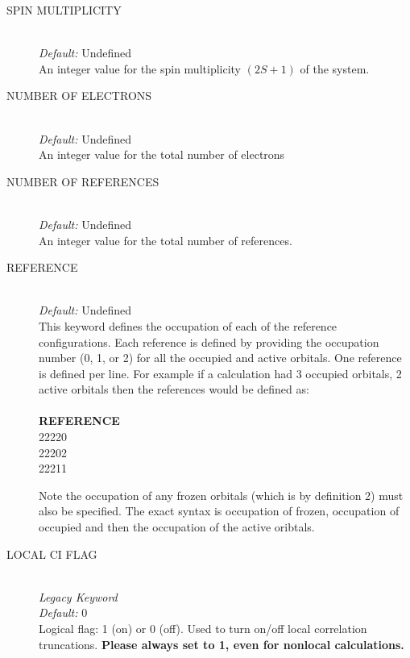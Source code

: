 \documentclass{article}
\begin{document}
\begin{description}
        \item[SPIN MULTIPLICITY ] \hfill \\
        \emph{Default:} Undefined \hfill \\
        An integer value for the spin multiplicity $(2S+1)$ of the system.
       
        \item[NUMBER OF ELECTRONS ] \hfill \\
        \emph{Default:} Undefined \hfill \\
        An integer value for the total number of electrons
        
        \item[NUMBER OF REFERENCES ] \hfill \\
        \emph{Default:} Undefined \hfill \\
        An integer value for the total number of references. 
        
        \item[REFERENCE ] \hfill \\
        \emph{Default:} Undefined \hfill \\
        This keyword defines the occupation of each of the reference configurations. Each reference is defined by providing the occupation number (0, 1, or 2) for all the occupied and active orbitals. One reference is defined per line. For example if a calculation had 3 occupied orbitals, 2 active orbitals then the references would be defined as: \hfill \\
        \hfill \\
        \textbf{REFERENCE} \hfill \\
        22220 \hfill \\
        22202 \hfill \\
        22211
                
        Note the occupation of any frozen orbitals (which is by definition 2) must also be specified. The exact syntax is occupation of frozen, occupation of occupied and then the occupation of the active oribtals. 

        \item[LOCAL CI FLAG ] \hfill \\
        \emph{Legacy Keyword} \hfill \\
        \emph{Default:} 0 \hfill \\
        Logical flag: 1 (on) or 0 (off). Used to turn on/off local correlation truncations. \textbf{Please always set to 1, even for nonlocal calculations.}
        

\end{description}
\end{document}
